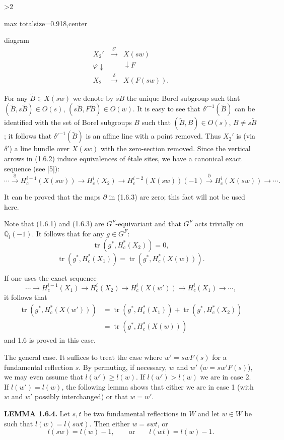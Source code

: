 \documentclass[9pt,twoside]{extarticle}
\newcommand{\EditionPage}[3]{%
  \ifnum#1>2\clearpage\fi
  \pdfbookmark[1]{Printed page #2}{en-folio-#2}%
  \hypertarget{en-physical-#1}{}%
  \noindent\begin{adjustbox}{max totalsize={\textwidth}{0.918\textheight},center}
  \begin{minipage}[t]{\textwidth}
  \fontsize{9.4}{11.1}\selectfont\justifying
  #3
  \end{minipage}
  \end{adjustbox}%
}
\begin{document}
\EditionPage{8}{109}{%
diagram \[
\tag{1.6.2}
\begin{array}{ccc}
X_2' & \xrightarrow{\delta'} & X(sw)\\
{\scriptstyle\varphi}\downarrow & & \downarrow{\scriptstyle F}\\
X_2 & \xrightarrow{\delta} & X(F(sw)).
\end{array}
\]\par

For any \(\widetilde B\in X(sw)\) we denote by \(s\widetilde B\) the unique Borel subgroup such that \((\widetilde B,s\widetilde B)\in O(s)\), \((s\widetilde B,F\widetilde B)\in O(w)\). It is easy to see that \(\delta'^{-1}(\widetilde B)\) can be identified with the set of Borel subgroups \(B\) such that \((\widetilde B,B)\in O(s)\), \(B\ne s\widetilde B\); it follows that \(\delta'^{-1}(\widetilde B)\) is an affine line with a point removed. Thus \(X_2'\) is (via \(\delta'\)) a line bundle over \(X(sw)\) with the zero-section removed. Since the vertical arrows in (1.6.2) induce equivalences of étale sites, we have a canonical exact sequence (see [5]): \[
\tag{1.6.3}
\cdots\xrightarrow{\partial}H_c^{i-1}(X(sw))\longrightarrow H_c^i(X_2)\longrightarrow H_c^{i-2}(X(sw))(-1)
\xrightarrow{\partial}H_c^i(X(sw))\longrightarrow\cdots.
\]\par

It can be proved that the maps \(\partial\) in (1.6.3) are zero; this fact will not be used here.\par

Note that (1.6.1) and (1.6.3) are \(G^F\)-equivariant and that \(G^F\) acts trivially on \(\overline{\mathbb{Q}}_l(-1)\). It follows that for any \(g\in G^F\): \[
\operatorname{tr}(g^*,H_c^*(X_2))=0,
\]  \[
\operatorname{tr}(g^*,H_c^*(X_1))=\operatorname{tr}(g^*,H_c^*(X(w))).
\]\par

If one uses the exact sequence \[
\cdots\longrightarrow H_c^{i-1}(X_1)\longrightarrow H_c^i(X_2)\longrightarrow H_c^i(X(w'))\longrightarrow H_c^i(X_1)\longrightarrow\cdots,
\] it follows that \[
\begin{aligned}
\operatorname{tr}(g^*,H_c^*(X(w')))
&=\operatorname{tr}(g^*,H_c^*(X_1))+\operatorname{tr}(g^*,H_c^*(X_2))\\
&=\operatorname{tr}(g^*,H_c^*(X(w)))
\end{aligned}
\] and 1.6 is proved in this case.\par

The general case. It suffices to treat the case where \(w'=swF(s)\) for a fundamental reflection \(s\). By permuting, if necessary, \(w\) and \(w'\) (\(w=sw'F(s)\)), we may even assume that \(l(w')\ge l(w)\). If \(l(w')>l(w)\) we are in case 2. If \(l(w')=l(w)\), the following lemma shows that either we are in case 1 (with \(w\) and \(w'\) possibly interchanged) or that \(w=w'\).\par

\noindent\textbf{LEMMA 1.6.4.} Let \(s,t\) be two fundamental reflections in \(W\) and let \(w\in W\) be such that \(l(w)=l(swt)\). Then either \(w=swt\), or \[
l(sw)=l(w)-1,\qquad\text{or}\qquad l(wt)=l(w)-1.
\]\par
}
\end{document}
